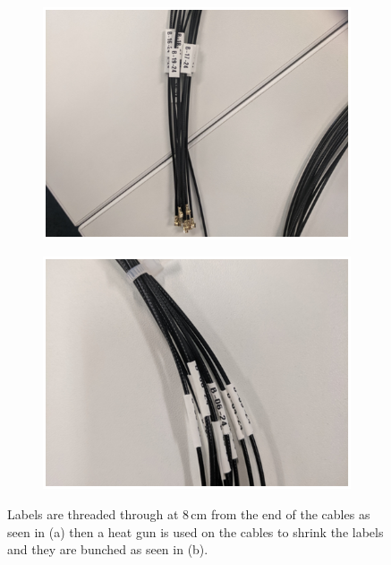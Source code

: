 \begin{figure}[!h]
\centering
\begin{subfigure}{.5\textwidth}
  \centering
  \includegraphics[width=\linewidth]{Chapter3/Figs/Raster/detCon020b_LabelsLoose.png}
  \captionsetup{width=.9\linewidth}
  \caption{}
  \label{subFig:detCon020b_LabelsLoose}
\end{subfigure}%
\begin{subfigure}{.5\textwidth}
  \centering
  \includegraphics[width=\linewidth]{Chapter3/Figs/Raster/detCon021b_LabelsHeated.png}
  \captionsetup{width=.9\linewidth}
  \caption{}
  \label{subFig:detCon021b_LabelsHeated}
\end{subfigure}
\caption{Labels are threaded through at 8\,cm from the end of the cables as seen in (a) then a heat gun is used on the cables to shrink the labels and they are bunched as seen in (b).}
\label{fig:detCon_LabelsLoose_LabelsHeated}
\end{figure}

